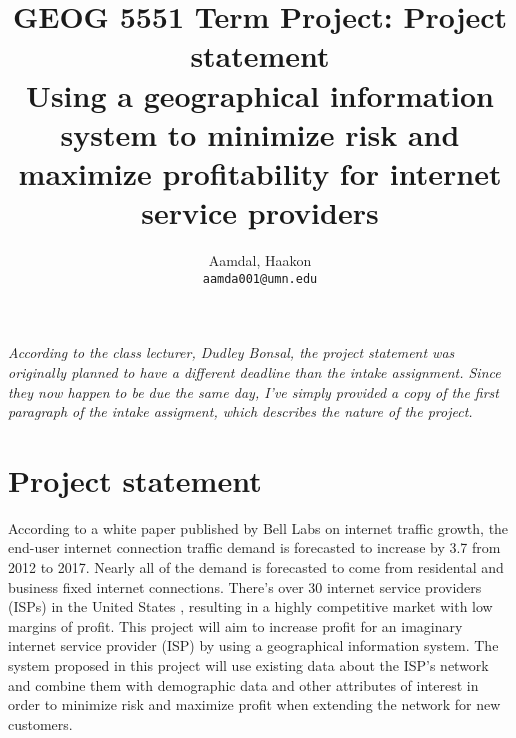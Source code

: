 \documentclass{article}
\title{
    GEOG 5551 Term Project: Project statement\\
    Using a geographical information system to minimize risk and maximize profitability for internet service providers
}
\author{
    Aamdal, Haakon\\
    \texttt{aamda001@umn.edu}
}
\begin{document}
\maketitle

\emph{According to the class lecturer, Dudley Bonsal, the project statement was originally planned to have a different deadline than the intake assignment. Since they now happen to be due the same day, I've simply provided a copy of the first paragraph of the intake assigment, which describes the nature of the project.}

\section*{Project statement}
\label{sec:Project statement}
According to a white paper published by Bell Labs \cite{Bell_Labs2013-st} on internet traffic growth, the end-user internet connection traffic demand is forecasted to increase by 3.7 from 2012 to 2017. Nearly all of the demand is forecasted to come from residental and business fixed internet connections. There's over 30 internet service providers (ISPs) in the United States \cite{noauthor_undated-uf}, resulting in a highly competitive market with low margins of profit. This project will aim to increase profit for an imaginary internet service provider (ISP) by using a geographical information system. The system proposed in this project will use existing data about the ISP's network and combine them with demographic data and other attributes of interest in order to minimize risk and maximize profit when extending the network for new customers.
\printbibliography
\end{document}
